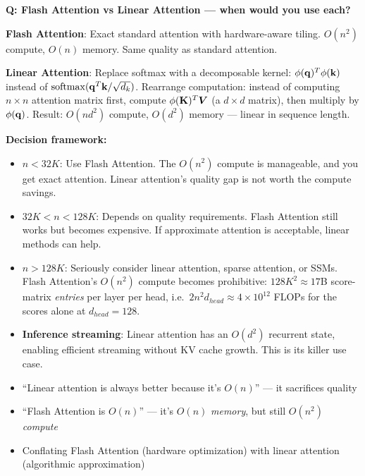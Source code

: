 \begin{interviewq}
\textbf{Q: Flash Attention vs Linear Attention --- when would you use each?}

 \quad {} \quad \badgefreq{\freqmed}

\stronganswer

\textbf{Flash Attention}: Exact standard attention with hardware-aware tiling. $O(n^2)$ compute, $O(n)$ memory. Same quality as standard attention.

\textbf{Linear Attention}: Replace softmax with a decomposable kernel: $\phi(\mathbf{q})^T\phi(\mathbf{k})$ instead of $\operatorname{softmax}(\mathbf{q}^T\mathbf{k}/\sqrt{d_k})$. Rearrange computation: instead of computing $n \times n$ attention matrix first, compute $\phi(\mathbf{K})^T\bm{V}$ (a $d \times d$ matrix), then multiply by $\phi(\mathbf{q})$. Result: $O(nd^2)$ compute, $O(d^2)$ memory --- linear in sequence length.

\textbf{Decision framework:}
\begin{itemize}
    \item \textbf{$n < 32K$}: Use Flash Attention. The $O(n^2)$ compute is manageable, and you get exact attention. Linear attention's quality gap is not worth the compute savings.
    \item \textbf{$32K < n < 128K$}: Depends on quality requirements. Flash Attention still works but becomes expensive. If approximate attention is acceptable, linear methods can help.
    \item \textbf{$n > 128K$}: Seriously consider linear attention, sparse attention, or SSMs. Flash Attention's $O(n^2)$ compute becomes prohibitive: $128K^2 \approx 17$B score-matrix \textit{entries} per layer per head, i.e.\ $2n^2 d_{head} \approx 4 \times 10^{12}$ FLOPs for the scores alone at $d_{head} = 128$.
    \item \textbf{Inference streaming}: Linear attention has an $O(d^2)$ recurrent state, enabling efficient streaming without KV cache growth. This is its killer use case.
\end{itemize}

\redflags
\begin{itemize}
    \item ``Linear attention is always better because it's $O(n)$'' --- it sacrifices quality
    \item ``Flash Attention is $O(n)$'' --- it's $O(n)$ \textit{memory}, but still $O(n^2)$ \textit{compute}
    \item Conflating Flash Attention (hardware optimization) with linear attention (algorithmic approximation)
\end{itemize}


\end{interviewq}
